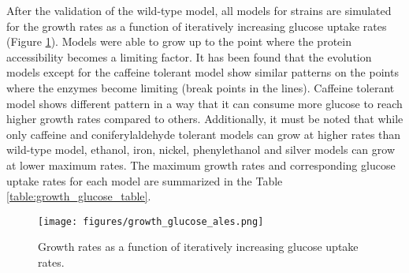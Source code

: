 After the validation of the wild-type model, all models for strains are simulated for the growth rates as a function of iteratively increasing glucose uptake rates (Figure \ref{fig:growth_glucose_ales}). Models were able to grow up to the point where the protein accessibility becomes a limiting factor. It has been found that the evolution models except for the caffeine tolerant model show similar patterns on the points where the enzymes become limiting (break points in the lines). Caffeine tolerant model shows different pattern in a way that it can consume more glucose to reach higher growth rates compared to others. Additionally, it must be noted that while only caffeine and coniferylaldehyde tolerant models can grow at higher rates than wild-type model, ethanol, iron, nickel, phenylethanol and silver models can grow at lower maximum rates. The maximum growth rates and corresponding glucose uptake rates for each model are summarized in the Table \ref{table:growth_glucose_table}.

\begin{figure}[H]
  \begin{center}
  \texttt{[image: figures/growth\_glucose\_ales.png]}
  \caption[Growth rates as a function of iteratively increasing glucose uptake rates]{Growth rates as a function of iteratively increasing glucose uptake rates.}
  \label{fig:growth_glucose_ales}
  \end{center}
  \end{figure}
\vspace{-1.0cm}



